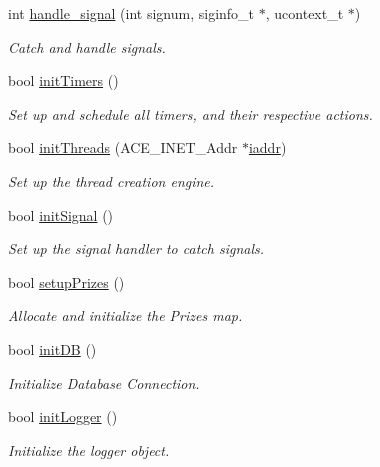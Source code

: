 \begin{CompactItemize}
int \hyperlink{classContest_Contesta6}{handle\_\-signal} (int signum, siginfo\_\-t $\ast$, ucontext\_\-t $\ast$)
\begin{CompactList}\small\item\em Catch and handle signals.\item\end{CompactList}\item 
bool \hyperlink{classContest_Contesta7}{init\-Timers} ()
\begin{CompactList}\small\item\em Set up and schedule all timers, and their respective actions.\item\end{CompactList}\item 
bool \hyperlink{classContest_Contesta8}{init\-Threads} (ACE\_\-INET\_\-Addr $\ast$\hyperlink{classContest_Contesto3}{iaddr})
\begin{CompactList}\small\item\em Set up the thread creation engine.\item\end{CompactList}\item 
bool \hyperlink{classContest_Contesta9}{init\-Signal} ()
\begin{CompactList}\small\item\em Set up the signal handler to catch signals.\item\end{CompactList}\item 
bool \hyperlink{classContest_Contesta10}{setup\-Prizes} ()
\begin{CompactList}\small\item\em Allocate and initialize the Prizes map.\item\end{CompactList}\item 
bool \hyperlink{classContest_Contesta11}{init\-DB} ()
\begin{CompactList}\small\item\em Initialize Database Connection.\item\end{CompactList}\item 
bool \hyperlink{classContest_Contesta12}{init\-Logger} ()
\begin{CompactList}\small\item\em Initialize the logger object.\item\end{CompactList}\item 

\end{CompactItemize}
